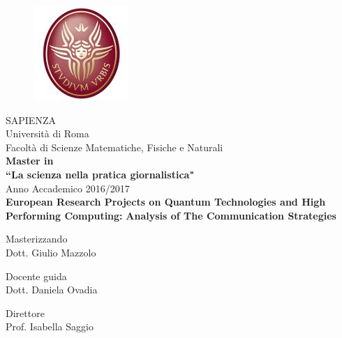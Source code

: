 \begin{titlepage}
 
 \begin{figure}[!t] 
   \begin{center}
   \includegraphics[scale=0.3]{Images/Logo_sapienza.jpg}
   \end{center}
 \end{figure}  
 
 \begin{center}
   SAPIENZA \\
   Universit\`a di Roma \\
   Facolt\`a di Scienze Matematiche, Fisiche e Naturali \\
   \vspace{10mm}
   \textbf{Master in} \\
   \textbf{``La scienza nella pratica giornalistica"}\\
   Anno Accademico 2016/2017 \\
   \vspace{10mm}
   \large \textbf{European Research Projects on Quantum Technologies and High Performing Computing:}
   \large \textbf{Analysis of The Communication Strategies}\\
 \end{center} 

 \vspace{10mm}

 \begin{center}
   Masterizzando\\
   Dott. Giulio Mazzolo
 \end{center}

 \vspace{10mm}

 \begin{flushleft}
   Docente guida\\ 
   Dott. Daniela Ovadia
 \end{flushleft}
 
 \begin{flushright}
   Direttore \, \, \, \, \, \, \\ 
   Prof. Isabella Saggio
 \end{flushright}
 

\end{titlepage}
